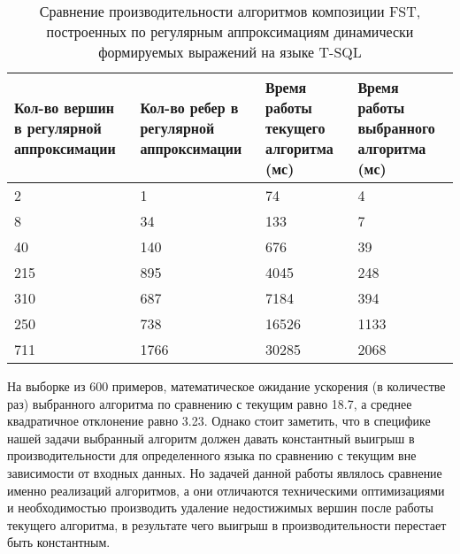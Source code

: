 \begin{table}[h]
  \centering
    \begin{tabular}{ | p{2.5cm} | p{2.3cm} | p{2.4cm} | p{2.4cm} | }
  \hline
  Кол-во вершин в регулярной аппроксимации &
  Кол-во ребер в регулярной аппроксимации & 
  Время работы текущего алгоритма (мс) & 
  Время работы выбранного алгоритма (мс) \\ \hline
  2 & 1 & 74 & 4 \\ \hline
  8 & 34 & 133 & 7 \\ \hline
  40 & 140 & 676 & 39 \\ \hline
  215 & 895 & 4045 & 248 \\ \hline
  310 & 687 & 7184 & 394 \\ \hline
  250 & 738 & 16526 & 1133 \\ \hline
  711 & 1766 & 30285 & 2068 \\ \hline
  \end{tabular}
  \caption{Сравнение производительности алгоритмов композиции FST, построенных по регулярным аппроксимациям динамически формируемых выражений на языке T-SQL}
  \label{table}
\end{table}

На выборке из 600 примеров, математическое ожидание ускорения (в количестве раз) выбранного алгоритма по сравнению с текущим равно 18.7, а среднее квадратичное отклонение равно 3.23. Однако стоит заметить, что в специфике нашей задачи выбранный алгоритм должен давать константный выигрыш в производительности для определенного языка по сравнению с текущим вне зависимости от входных данных. Но задачей данной работы являлось сравнение именно реализаций алгоритмов, а они отличаются техническими оптимизациями и необходимостью производить удаление недостижимых вершин после работы текущего алгоритма, в результате чего выигрыш в производительности перестает быть константным.

